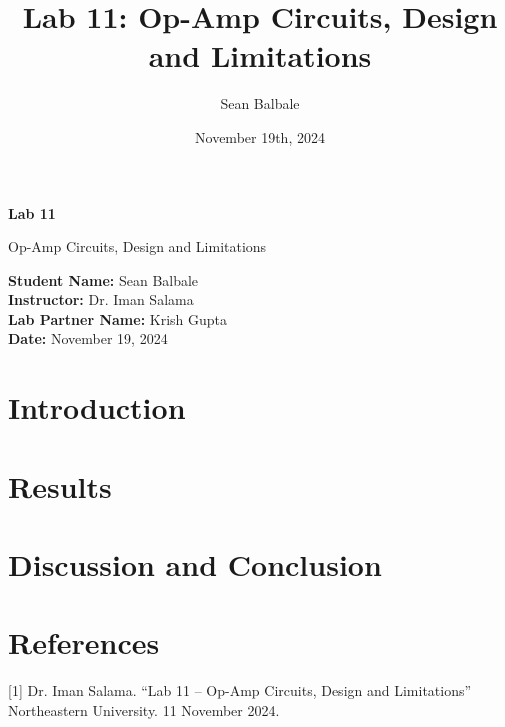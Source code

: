 \documentclass[12pt]{article}
\title{Lab 11: Op-Amp Circuits, Design and Limitations}
\author{Sean Balbale}
\date{November 19th, 2024}
\begin{document}
\begin{titlepage}
  \begin{center}
    \vspace*{1in}

    \Huge
    \textbf{Lab 11}

    \LARGE
    Op-Amp Circuits, Design and Limitations

    \vspace{3 in}

    \textbf{Student Name:} Sean Balbale
    \\ \textbf{Instructor:} Dr. Iman Salama
    \\ \textbf{Lab Partner Name:} Krish Gupta
    \\ \textbf{Date:} November 19, 2024

    \vfill

  \end{center}
\end{titlepage}

\newpage

\section{Introduction}

\section{Results}


\section{Discussion and Conclusion}


\section{References}
[1] Dr. Iman Salama. “Lab 11 – Op-Amp Circuits, Design and Limitations” Northeastern University. 11 November 2024.
\end{document}

